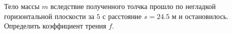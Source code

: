 Тело массы $m$ вследствие полученного толчка
прошло по негладкой горизонтальной плоскости
за $5$ с расстояние $s=24.5$ м
и остановилось. Определить коэффициент трения $f$.
